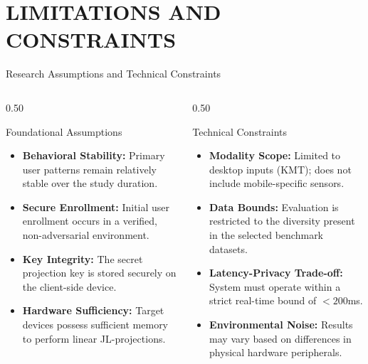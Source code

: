 
\section{LIMITATIONS AND CONSTRAINTS}

\begin{frame}{Research Assumptions and Technical Constraints}
    \vspace{-1.5em}
    \begin{columns}[T]
        \begin{column}{0.50\textwidth}
            \begin{block}{Foundational Assumptions}
                \fontsize{8.5pt}{10.5pt}\selectfont
                \begin{itemize}
                    \setlength{\itemsep}{6pt}
                    \item \textbf{Behavioral Stability:} Primary user patterns remain relatively stable over the study duration.
                    \item \textbf{Secure Enrollment:} Initial user enrollment occurs in a verified, non-adversarial environment.
                    \item \textbf{Key Integrity:} The secret projection key is stored securely on the client-side device.
                    \item \textbf{Hardware Sufficiency:} Target devices possess sufficient memory to perform linear JL-projections.
                \end{itemize}
            \end{block}
        \end{column}

        \begin{column}{0.50\textwidth}
            \begin{block}{Technical Constraints}
                \fontsize{8.5pt}{10.5pt}\selectfont
                \begin{itemize}
                    \setlength{\itemsep}{6pt}
                    \item \textbf{Modality Scope:} Limited to desktop inputs (KMT); does not include mobile-specific sensors.
                    \item \textbf{Data Bounds:} Evaluation is restricted to the diversity present in the selected benchmark datasets.
                    \item \textbf{Latency-Privacy Trade-off:} System must operate within a strict real-time bound of $<200$ms.
                    \item \textbf{Environmental Noise:} Results may vary based on differences in physical hardware peripherals.
                \end{itemize}
            \end{block}
        \end{column}
    \end{columns}
\end{frame}